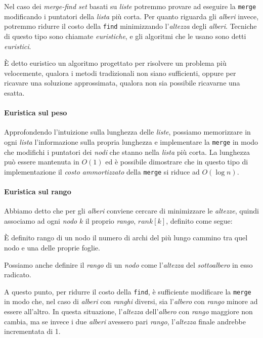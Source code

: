 Nel caso dei \emph{merge-find set} basati su \emph{liste} potremmo provare ad
eseguire la \texttt{merge} modificando i puntatori della \emph{lista} più corta.
Per quanto riguarda gli \emph{alberi} invece, potremmo ridurre il costo della
\texttt{find} minimizzando l'\emph{altezza} degli \emph{alberi}. Tecniche di
questo tipo sono chiamate \emph{euristiche}, e gli algoritmi che le usano sono
detti \emph{euristici}.

\begin{definition}
    È detto euristico un algoritmo progettato per risolvere un problema più
    velocemente, qualora i metodi tradizionali non siano sufficienti, oppure per
    ricavare una soluzione approssimata, qualora non sia possibile ricavarne una
    esatta.
\end{definition}

\paragraph{Euristica sul peso}
Approfondendo l'intuizione sulla lunghezza delle \emph{liste}, possiamo
memorizzare in ogni \emph{lista} l'informazione sulla propria lunghezza e
implementare la \texttt{merge} in modo che modifichi i puntatori dei \emph{nodi}
che stanno nella \emph{lista} più corta. La lunghezza può essere mantenuta in
$O(1)$ ed è possibile dimostrare che in questo tipo di implementazione il
\emph{costo ammortizzato} della \texttt{merge} si riduce ad $O(\log n)$.

\paragraph{Euristica sul rango}
Abbiamo detto che per gli \emph{alberi} conviene cercare di minimizzare le
\emph{altezze}, quindi associamo ad ogni \emph{nodo} $k$ il proprio
\emph{rango}, $rank[k]$, definito come segue:

\begin{definition}
    È definito rango di un nodo il numero di archi del più lungo cammino tra
    quel nodo e una delle proprie foglie.
\end{definition}
\begin{note}
    Possiamo anche definire il \emph{rango} di un \emph{nodo} come
    l'\emph{altezza} del \emph{sottoalbero} in esso radicato.
\end{note}

\noindent
A questo punto, per ridurre il costo della \texttt{find}, è sufficiente
modificare la \texttt{merge} in modo che, nel caso di \emph{alberi} con
\emph{ranghi} diversi, sia l'\emph{albero} con \emph{rango} minore ad essere
 all'altro. In questa situazione, l'\emph{altezza}
dell'\emph{albero} con \emph{rango} maggiore non cambia, ma se invece i due
\emph{alberi} avessero pari \emph{rango}, l'\emph{altezza} finale andrebbe
incrementata di 1.

